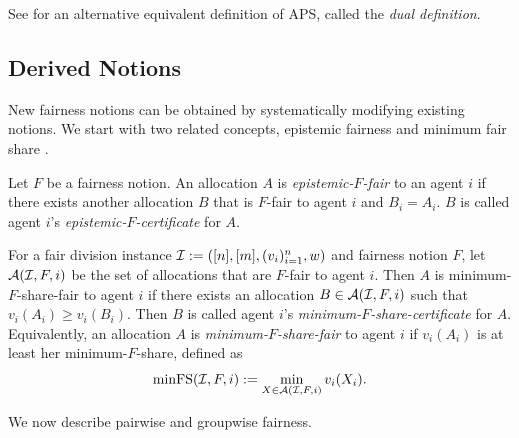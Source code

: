 
See  for an alternative equivalent definition of APS, called the \emph{dual definition}.

\subsection{Derived Notions}

New fairness notions can be obtained by systematically modifying existing notions.
%
We start with two related concepts, epistemic fairness \citep{aziz2018knowledge,caragiannis2023new}
and minimum fair share \citep{caragiannis2023new}.

\begin{definition}
\label{defn:epistemic}
Let $F$ be a fairness notion.
An allocation $A$ is \emph{epistemic-$F$-fair} to an agent $i$ if
there exists another allocation $B$ that is $F$-fair to agent $i$ and $B_i = A_i$.
$B$ is called agent $i$'s \emph{epistemic-$F$-certificate} for $A$.
\end{definition}

\begin{definition}
\label{defn:minfs}
For a fair division instance $\mathcal{I} := ([n],\allowbreak [m],\allowbreak (v_i)_{i=1}^n,\allowbreak w)$
and fairness notion $F$, let $\mathcal{A}(\mathcal{I}, F, i)$ be the set of allocations
that are $F$-fair to agent $i$.
%
Then $A$ is minimum-$F$-share-fair to agent $i$ if there exists
an allocation $B \in \mathcal{A}(\mathcal{I}, F, i)$ such that $v_i(A_i) \ge v_i(B_i)$.
Then $B$ is called agent $i$'s \emph{minimum-$F$-share-certificate} for $A$.
%
Equivalently, an allocation $A$ is \emph{minimum-$F$-share-fair} to agent $i$ if
$v_i(A_i)$ is at least her minimum-$F$-share, defined as
\[ \operatorname{minFS}(\mathcal{I}, F, i) := \min_{X \in \mathcal{A}(\mathcal{I}, F, i)} v_i(X_i). \]
\end{definition}

We now describe pairwise \citep{caragiannis2019unreasonable}
and groupwise \citep{barman2018groupwise} fairness.

